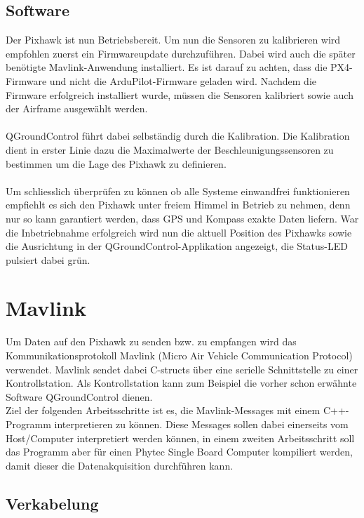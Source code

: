 \documentclass[12pt]{article} %
\begin{document}
	\subsection{Software}
	Der Pixhawk ist nun Betriebsbereit. Um nun die Sensoren zu kalibrieren wird empfohlen zuerst ein Firmwareupdate durchzuführen. Dabei wird auch die später benötigte Mavlink-Anwendung installiert. Es ist darauf zu achten, dass die PX4-Firmware und nicht die ArduPilot-Firmware geladen wird. Nachdem die Firmware erfolgreich installiert wurde, müssen die Sensoren kalibriert sowie auch der Airframe ausgewählt werden. 
	\\ \\
	QGroundControl führt dabei selbständig durch die Kalibration. Die Kalibration dient in erster Linie dazu die Maximalwerte der Beschleunigungssensoren zu bestimmen um die Lage des Pixhawk zu definieren.
	\\ \\
	Um schliesslich überprüfen zu können ob alle Systeme einwandfrei funktionieren empfiehlt es sich den Pixhawk unter freiem Himmel in Betrieb zu nehmen, denn nur so kann garantiert werden, dass GPS und Kompass exakte Daten liefern. War die Inbetriebnahme erfolgreich wird nun die aktuell Position des Pixhawks sowie die Ausrichtung in der QGroundControl-Applikation angezeigt, die Status-LED pulsiert dabei grün.
	
	
	\section{Mavlink}
	Um Daten auf den Pixhawk zu senden bzw. zu empfangen wird das Kommunikationsprotokoll Mavlink (Micro Air Vehicle Communication Protocol) verwendet. Mavlink sendet dabei C-structs über eine serielle Schnittstelle zu einer Kontrollstation. Als Kontrollstation kann zum Beispiel die vorher schon erwähnte Software QGroundControl dienen.
	\\Ziel der folgenden Arbeitsschritte ist es, die Mavlink-Messages mit einem C++-Programm interpretieren zu können. Diese Messages sollen dabei einerseits vom Host/Computer interpretiert werden können, in einem zweiten Arbeitsschritt soll das Programm aber für einen Phytec Single Board Computer kompiliert werden, damit dieser die Datenakquisition durchführen kann. 
	
	\subsection{Verkabelung}
\end{document}
